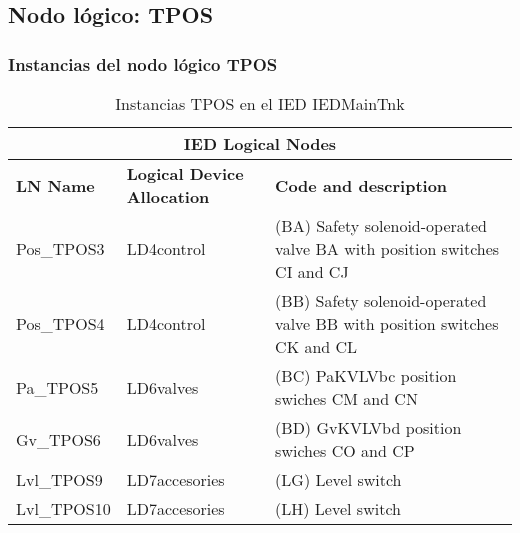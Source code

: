
\subsection{Nodo l\'ogico: 			 TPOS}

    \subsubsection{Instancias del nodo l\'ogico TPOS}
    \begin{table}[H]
    \begin{center}
    \begin{tabular}{|l|l|p{6.8cm}|}
            \hline
            \multicolumn{3}{|c|}{\cellcolor[gray]{0.8} \textbf{IED Logical Nodes} } \\
            \hline
            \textbf{LN Name} & \textbf{Logical Device Allocation} & \textbf{Code and description} \\
            \hline
            Pos\_TPOS3 & LD4control & (BA) Safety solenoid-operated valve BA with position switches CI and CJ \\
            \hline
            Pos\_TPOS4 & LD4control & (BB) Safety solenoid-operated valve BB with position switches CK and CL \\
            \hline
            Pa\_TPOS5 & LD6valves & (BC) PaKVLVbc position swiches CM and CN \\
            \hline
            Gv\_TPOS6 & LD6valves & (BD) GvKVLVbd position swiches CO and CP \\
            \hline
            Lvl\_TPOS9 & LD7accesories & (LG) Level switch \\
            \hline
            Lvl\_TPOS10 & LD7accesories & (LH) Level switch \\
            \hline
    \end{tabular}
    \caption{Instancias TPOS en el IED IEDMainTnk}
    \label{table:lnInstTPOS_lvl_sw}
    \end{center}
    \end{table}
    
    
    
